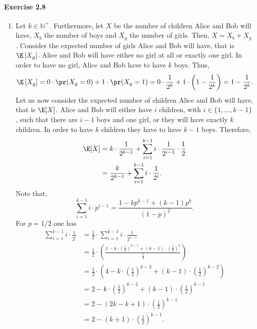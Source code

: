 \paragraph{Exercise 2.8}
\begin{enumerate}
  \item[(a)] Let $k \in \mathbb{N}^+$. Furthermore, let $X$ be the number of
  children Alice and Bob will have, $X_b$ the number of boys and $X_g$ the
  number of girls. Then, $X = X_b + X_g$. Consider the expected number of girls
  Alice and Bob will have, that is $\E\left[X_g\right]$. Alice and Bob will have
  either no girl at all or exactly one girl. In order to have no girl, Alice and
  Bob have to have $k$ boys. Thus,
  \[
    \E\left[X_g\right]
      = 0 \cdot \pr(X_g = 0) + 1 \cdot \pr(X_g = 1)
      = 0  \cdot \frac{1}{2^k} + 1 \cdot \left( 1 - \frac{1}{2^k} \right)
      = 1 - \frac{1}{2^k}.
  \]
  Let us now consider the expected number of children Alice and Bob will have,
  that is $\E[X]$. Alice and Bob will either have $i$ children, with
  $i \in \{ 1, ..., k-1 \}$, such that there are $i-1$ boys and one girl, or
  they will have exactly $k$ children. In order to have $k$ children they have
  to have $k-1$ boys. Therefore,
  \begin{align*}
    \E[X]
      &= k \cdot \frac{1}{2^{k-1}} + \sum_{i = 1}^{k-1} i \cdot \frac{1}{2^{i-1}} \cdot \frac{1}{2} \\
      &= \frac{k}{2^{k-1}} + \sum_{i = 1}^{k-1} i \cdot \frac{1}{2^{i}}.
  \end{align*}
  Note that,
  \[
    \sum_{i=1}^{k-1} i \cdot p^{i-1} = \frac{1 - kp^{k-1} + (k-1)p^k}{(1-p)^2}.
  \]
  For $p = 1/2$ one has
  \begin{align*}
    \sum_{i = 1}^{k-1} i \cdot \frac{1}{2^{i}}
      &= \frac{1}{2} \cdot \sum_{i = 1}^{k-1} i \cdot \frac{1}{2^{i-1}} \\
      &= \frac{1}{2} \cdot \left(\frac{1 - k \cdot \left(\frac{1}{2}\right)^{k-1} + (k-1)\cdot \left(\frac{1}{2}\right)^{k}}{\frac{1}{4}}\right) \\
      &= \frac{1}{2} \cdot \left(4 - k \cdot \left(\frac{1}{2}\right)^{k-3} + (k-1)\cdot \left(\frac{1}{2}\right)^{k-2} \right) \\
      &= 2 - k \cdot \left(\frac{1}{2}\right)^{k-2} + (k-1)\cdot \left(\frac{1}{2}\right)^{k-1} \\
      &= 2 - \left( 2k - k + 1 \right) \cdot \left(\frac{1}{2}\right)^{k-1} \\
      &= 2 - \left( k + 1 \right) \cdot \left(\frac{1}{2}\right)^{k-1}.

\end{align*}
\end{enumerate}
